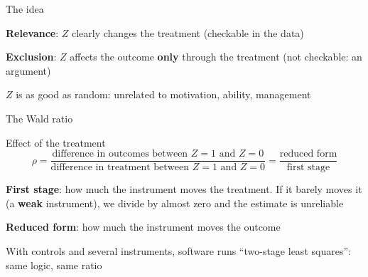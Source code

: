 \documentclass[aspectratio=169,xcolor=table]{beamer}
\begin{document}
\begin{frame}{The idea}
\centering
{}

\raggedright\small
\be
  \item \textbf{Relevance}: $Z$ clearly changes the treatment (checkable in the data)
  \item \textbf{Exclusion}: $Z$ affects the outcome \textbf{only} through the treatment (not checkable: an argument)
  \item $Z$ is as good as random: unrelated to motivation, ability, management
\ee
\end{frame}

\begin{frame}{The Wald ratio}
\begin{block}{Effect of the treatment}
\[ \rho = \frac{\text{difference in outcomes between } Z=1 \text{ and } Z=0}{\text{difference in treatment between } Z=1 \text{ and } Z=0} = \frac{\text{reduced form}}{\text{first stage}} \]
\end{block}
\small
\bi
  \item \textbf{First stage}: how much the instrument moves the treatment. If it barely moves it (a \textbf{weak} instrument), we divide by almost zero and the estimate is unreliable
  \item \textbf{Reduced form}: how much the instrument moves the outcome
  \item With controls and several instruments, software runs ``two-stage least squares'': same logic, same ratio
\ei
\end{frame}
\end{document}
